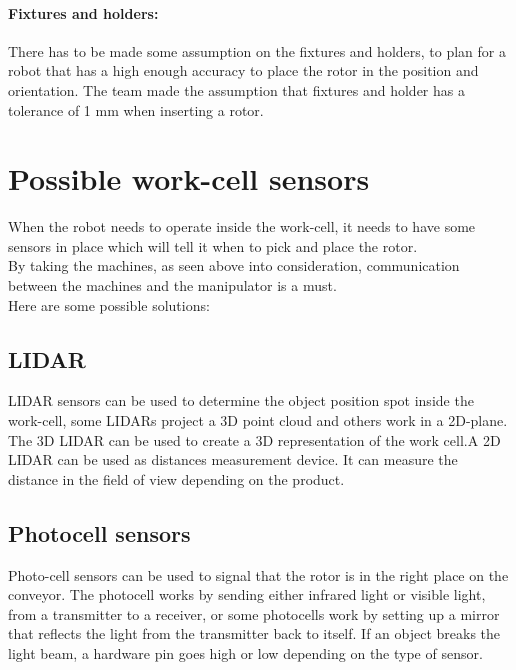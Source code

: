 \paragraph{Fixtures and holders:} There has to be made some assumption on the fixtures and holders, to plan for a robot that has a high enough accuracy to place the rotor in the position and orientation. The team made the assumption that fixtures and holder has a tolerance of 1 mm when inserting a rotor. 

 
 \section{Possible work-cell sensors}\label{ref:PlacementS}
 
 When the robot needs to operate inside the work-cell, it needs to have some sensors in place which will tell it when to pick and place the rotor.\\
 By taking the machines, as seen above into consideration, communication between the machines and the manipulator is a must.\\
 Here are some possible solutions:\\

 
  \subsection{LIDAR} 
  LIDAR sensors can be used to determine the object position spot inside the work-cell, some LIDARs project a 3D point cloud and others work in a 2D-plane\cite{LIDAR}.\\
  The 3D LIDAR can be used to create a 3D representation of the work cell.A 2D LIDAR can be used as distances measurement device. It can measure the distance in the field of view depending on the product\cite{LIDAR}.\\

 
  \subsection{Photocell sensors} 
  Photo-cell sensors can be used to signal that the rotor is in the right place on the conveyor. The photocell works by sending either infrared light or visible light, from a transmitter to a receiver, or some photocells work by setting up a mirror that reflects the light from the transmitter back to itself. If an object breaks the light beam, a hardware pin goes high or low depending on the type of sensor\cite{SICKfo}.\\

